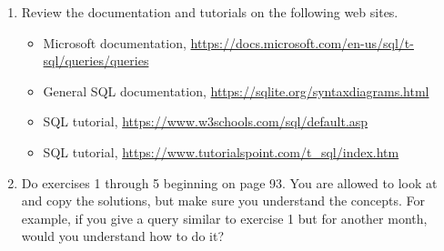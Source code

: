 \documentclass{article}
\begin{document}
    \begin{enumerate}

        \item Review the documentation and tutorials on the following web sites.
            \begin{itemize}
                \item Microsoft documentation, \url{https://docs.microsoft.com/en-us/sql/t-sql/queries/queries}
                \item General SQL documentation, \url{https://sqlite.org/syntaxdiagrams.html}
                \item SQL tutorial, \url{https://www.w3schools.com/sql/default.asp}
                \item SQL tutorial, \url{https://www.tutorialspoint.com/t_sql/index.htm}
            \end{itemize}


        \item Do exercises 1 through 5 beginning on page 93. You are allowed to look at and copy the solutions, but make sure you understand the concepts. For example, if you give a query similar to exercise 1 but for another month, would you understand how to do it?

    \end{enumerate}



        
\end{document}
